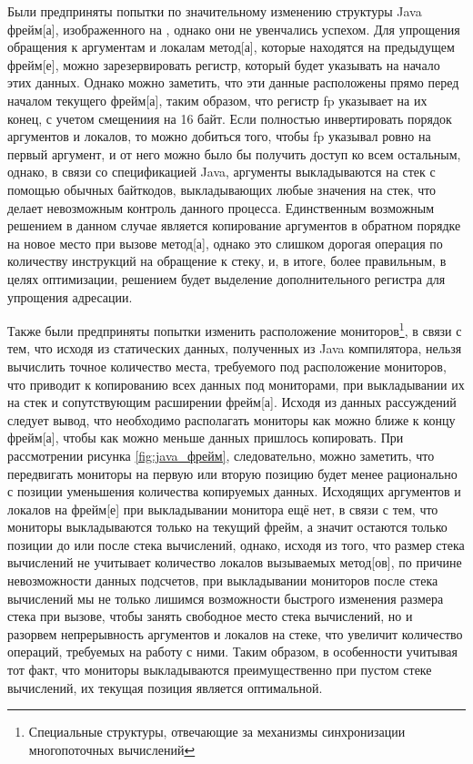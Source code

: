 
Были предприняты попытки по значительному изменению структуры Java \gls{фрейм}[а], изображенного на , однако они не увенчались успехом. Для упрощения обращения к аргументам и локалам \gls{метод}[а], которые находятся на предыдущем \gls{фрейм}[е], можно зарезервировать регистр, который будет указывать на начало этих данных. Однако можно заметить, что эти данные расположены прямо перед началом текущего \gls{фрейм}[а], таким образом, что регистр fp указывает на их конец, с учетом смещениия на 16 байт. Если полностью инвертировать порядок аргументов и локалов, то можно добиться того, чтобы fp указывал ровно на первый аргумент, и от него можно было бы получить доступ ко всем остальным, однако, в связи со спецификацией Java, аргументы выкладываются на стек с помощью обычных байткодов, выкладывающих любые значения на стек, что делает невозможным контроль данного процесса. Единственным возможным решением в данном случае является копирование аргументов в обратном порядке на новое место при вызове \gls{метод}[а], однако это слишком дорогая операция по количеству инструкций на обращение к стеку, и, в итоге, более правильным, в целях оптимизации, решением будет выделение дополнительного регистра для упрощения адресации.

Также были предприняты попытки изменить расположение мониторов\footnote{Специальные структуры, отвечающие за механизмы синхронизации многопоточных вычислений}, в связи с тем, что исходя из статических данных, полученных из Java компилятора, нельзя вычислить точное количество места, требуемого под расположение мониторов, что приводит к копированию всех данных под мониторами, при выкладывании их на стек и сопутствующим расширении \gls{фрейм}[а]. Исходя из данных рассуждений следует вывод, что необходимо располагать мониторы как можно ближе к концу \gls{фрейм}[а], чтобы как можно меньше данных пришлось копировать. При рассмотрении рисунка \ref{fig:java_фрейм}, следовательно, можно заметить, что передвигать мониторы на первую или вторую позицию будет менее рационально с позиции уменьшения количества копируемых данных. Исходящих аргументов и локалов на \gls{фрейм}[е] при выкладывании монитора ещё нет, в связи с тем, что мониторы выкладываются только на текущий фрейм, а значит остаются только позиции до или после стека вычислений, однако, исходя из того, что размер стека вычислений не учитывает количество локалов вызываемых \gls{метод}[ов], по причине невозможности данных подсчетов, при выкладывании мониторов после стека вычислений мы не только лишимся возможности быстрого изменения размера стека при вызове, чтобы занять свободное место стека вычислений, но и разорвем непрерывность аргументов и локалов на стеке, что увеличит количество операций, требуемых на работу с ними. Таким образом, в особенности учитывая тот факт, что мониторы выкладываются преимущественно при пустом стеке вычислений, их текущая позиция является оптимальной.



